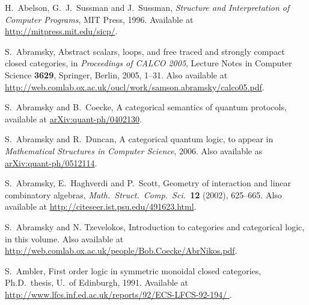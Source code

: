 \documentclass[12pt]{article}
\begin{document}
\begin{thebibliography}{99}

\newcommand{\quantph}[1]{\href{http://arxiv.org/abs/quant-ph/#1}{{ arXiv:quant-ph/#1}}}
\newcommand{\hepth}[1]{\href{http://arxiv.org/abs/hep-th/#1}{{ arXiv:hep-th/#1}}}
\newcommand{\grqc}[1]{\href{http://arxiv.org/abs/gr-qc/#1}{{ arXiv:gr-qc/#1}}}
\newcommand{\qalg}[1]{\href{http://arxiv.org/abs/q-alg/#1}{{ arXiv:q-alg/#1}}}
\newcommand{\mathph}[1]{\href{http://arxiv.org/abs/math-ph/#1}{{ arXiv:math-ph/#1}}}
\newcommand{\Math}[1]{\href{http://arxiv.org/abs/math/#1}{{ arXiv:math/#1}}}
\newcommand{\arxiv}[1]{\href{http://arxiv.org/abs/#1}{{ arXiv:#1}}}

 H.\ Abelson, G.\ J.\ Sussman and J.\
Sussman, {\sl Structure and Interpretation of Computer Programs},
MIT Press, 1996.  Available at \href{http://mitpress.mit.edu/sicp/}{{ http://mitpress.mit.edu/sicp/}}.

S.\ Abramsky, Abstract scalars, loops, and free traced and strongly 
compact closed categories, in {\sl Proceedings of CALCO 2005}, 
Lecture Notes in Computer Science {\bf 3629}, Springer, Berlin,
2005, 1--31. Also available at \hfill \break 
\href{http://web.comlab.ox.ac.uk/oucl/work/samson.abramsky/calco05.pdf}{ http://web.comlab.ox.ac.uk/oucl/work/samson.abramsky/calco05.pdf}.

 S.\ Abramsky and B.\ Coecke, A categorical semantics of
quantum protocols, available at \quantph{0402130}.

S.\ Abramsky and R.\ Duncan, A categorical quantum logic, to appear 
in {\sl Mathematical Structures in Computer Science}, 2006.
Also available as \quantph{0512114}.

 S.\ Abramsky, E.\ Haghverdi and P.\ Scott,
Geometry of interaction and linear combinatory algebras, 
{\sl Math.\ Struct.\ Comp.\ Sci.\ }{\bf 12} (2002), 625--665.  Also
available at \hfill \break
\href{http://citeseer.ist.psu.edu/491623.html}{ http://citeseer.ist.psu.edu/491623.html}.

 S.\ Abramsky and N. Tzevelokos, Introduction to categories
and categorical logic, in this volume.  Also available at
\href{http://web.comlab.ox.ac.uk/people/Bob.Coecke/AbrNikos.pdf}{ http://web.comlab.ox.ac.uk/people/Bob.Coecke/AbrNikos.pdf}.

 S.\ Ambler, First order logic in symmetric monoidal
closed categories, Ph.D.\ thesis, U.\ of Edinburgh, 1991.  
Available at 
\href{http://www.lfcs.inf.ed.ac.uk/reports/92/ECS-LFCS-92-194/}{http://www.lfcs.inf.ed.ac.uk/reports/92/ECS-LFCS-92-194/ }.


\end{thebibliography}
\end{document}
